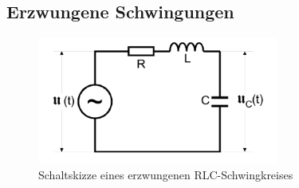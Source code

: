 \subsection{Erzwungene Schwingungen}


\begin{figure}[H]
  \centering
  \includegraphics{content/ErzwungenerSchwingkreis.png}
  \caption{Schaltskizze eines erzwungenen RLC-Schwingkreises \cite{sample354}}
  \label{fig:esk}
\end{figure}



